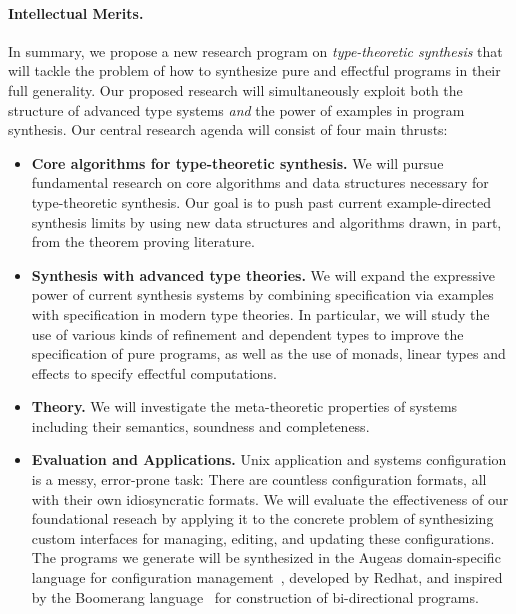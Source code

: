 \paragraph*{Intellectual Merits.}
In summary, we propose a new research program on \emph{type-theoretic synthesis}
that will tackle the
problem of how to synthesize pure and effectful 
programs in their full generality.  Our proposed
research will simultaneously exploit both the structure of advanced
type systems \emph{and} the power of examples in program synthesis.
Our central research agenda will consist of four main thrusts:

\begin{itemize}
\item {\bf Core algorithms for type-theoretic synthesis.}
We will pursue fundamental research on core algorithms
and data structures necessary for type-theoretic synthesis.
Our goal is to push past current example-directed synthesis limits
by using new data structures and algorithms drawn, in part, from the
theorem proving literature.
\item {\bf Synthesis with advanced type theories.}
We will expand the expressive power of current synthesis systems by combining
specification via examples with specification in modern type theories.
In particular, we will study the use of various kinds of 
refinement and dependent types to improve the specification of pure
programs, as well as the use of monads, linear types and effects
to specify effectful computations. 
\item {\bf Theory.}
We will investigate the meta-theoretic properties of systems including
their semantics, soundness and completeness.  
\item {\bf Evaluation and Applications.}
Unix application and systems configuration is a messy, error-prone task:
There are countless configuration formats, all with their own idiosyncratic
formats.  We will evaluate the effectiveness of our foundational reseach 
by applying it to the concrete problem
of synthesizing custom interfaces for managing, editing, and updating these
configurations.  The programs we generate will be synthesized in the Augeas domain-specific
language for configuration management~\cite{augeas}, developed by Redhat,
and inspired by the Boomerang language~\cite{Boomerang07,bohannon2008boomerang,foster-thesis} for construction of bi-directional
programs.
\end{itemize}


